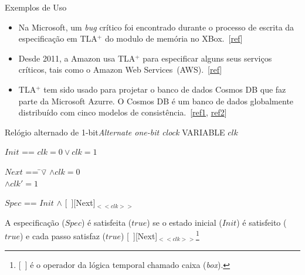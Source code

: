 \begin{frame}{Exemplos de Uso}\small
  \begin{itemize}[<+-| alert@+>]
  \item Na Microsoft, um \textit{bug} crítico foi encontrado durante o
    processo de escrita da especificação em TLA$^+$ do modulo de
    memória no
    XBox.~[\href{http://channel9.msdn.com/Events/Build/2014/3-642\#time=21m46s}{ref}]
  \item Desde 2011, a Amazon usa TLA$^+$ para especificar alguns seus
    serviços críticos, tais como o Amazon Web
    Services~(AWS).~[\href{http://lamport.azurewebsites.net/tla/amazon.html}{ref}]
  \item TLA$^+$ tem sido usado para projetar o banco de dados Cosmos
    DB que faz parte da Microsoft Azurre. O Cosmos DB é um banco de
    dados globalmente distribuído com cinco modelos de
    consistência.~[\href{https://techcrunch.com/2017/05/10/with-cosmos-db-microsoft-wants-to-build-one-database-to-rule-them-all/}{ref1},
    \href{https://techcrunch.com/2017/05/10/with-cosmos-db-microsoft-wants-to-build-one-database-to-rule-them-all/}{ref2}]
  \end{itemize}
  
\end{frame}

\begin{frame}{Relógio alternado de 1-bit}{\em Alternate one-bit clock}
  VARIABLE $clk$  

  \pause

  \bigskip
   $Init$ == $clk = 0 \lor clk=1$ \\

  \pause
  \bigskip\begingroup

    \hfill
    \begin{tabbing}
      $Next$ == \=$\lor$\= $\land clk = 0$\\
      \>\>$\land clk' = 1$\\
    \end{tabbing}
  
\endgroup

\pause\bigskip

$Spec$ == $Init$ $\land$ [\ ][Next]$_{<<clk>>}$ 

\pause\medskip

{\scriptsize\color{blue} A especificação ($Spec$) é satisfeita ($true$) se o
  estado inicial ($Init$) é satisfeito ($true$) e cada passo satisfaz
  ($true$) [\ ][Next]$_{<<clk>>}$\footnote{\tiny [\ ] é o operador da lógica temporal
   chamado caixa ({\em box}).}}

\end{frame}

